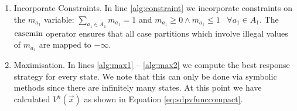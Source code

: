 \begin{enumerate}
  \item Incorporate Constraints. 
            In line \ref{alg:constraint} we incorporate constraints on the $m_{a_{1}}$ variable: 
            {\small $\sum_{a_{1} \in A_1} m_{a_{1}} = 1$} and 
            {\small $m_{a_{1}} \geq 0 \wedge m_{a_{1}} \leq 1 \hspace{10pt} \forall a_{1} \in A_1 $}.
            The $\mathrm{casemin}$ operator ensures that all case partitions which involve illegal values of 
            $m_{a_{1}}$ are mapped to $-\infty$.
  \item Maximisation. 
            In lines \ref{alg:max1} -- \ref{alg:max2} we compute the best response strategy for every state. We note that this can only be done
            via symbolic methods since there are infinitely many states. At this point we have calculated $V^{h}(\vec{x})$ as shown in 
            Equation \eqref{eq:sdpvfunccompact}.
\end{enumerate}

